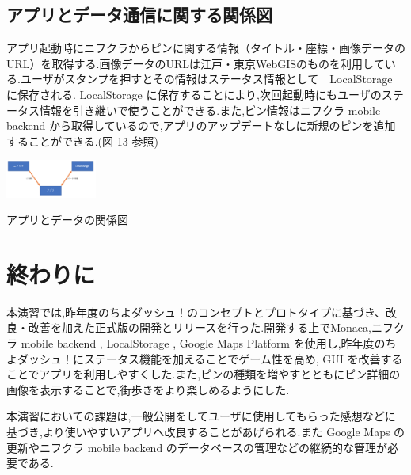 \documentclass[a4paper, twoside]{jarticle}
\makeatletter
\newenvironment{figurehere}
  {\def\@captype{figure}}
  {}
\makeatother
\begin{document}
\begin{multicols}{2}
\subsection{アプリとデータ通信に関する関係図}
アプリ起動時にニフクラからピンに関する情報（タイトル・座標・画像データのURL）を取得する.画像データのURLは江戸・東京WebGISのものを利用している.ユーザがスタンプを押すとその情報はステータス情報として　LocalStorage に保存される. LocalStorage に保存することにより,次回起動時にもユーザのステータス情報を引き継いで使うことができる.また,ピン情報はニフクラ mobile backend から取得しているので,アプリのアップデートなしに新規のピンを追加することができる.(図 13 参照)
\begin{figurehere}
\begin{center}
\includegraphics[bb=30 100 550 500,width=3cm]{./image12.png}%
\end{center}
\caption{アプリとデータの関係図}\label{fig:13}
\end{figurehere}


\section{終わりに}
本演習では,昨年度のちよダッシュ！のコンセプトとプロトタイプに基づき、改良・改善を加えた正式版の開発とリリースを行った.開発する上でMonaca,ニフクラ mobile backend , LocalStorage , Google Maps Platform を使用し,昨年度のちよダッシュ！にステータス機能を加えることでゲーム性を高め, GUI を改善することでアプリを利用しやすくした.また,ピンの種類を増やすとともにピン詳細の画像を表示することで,街歩きをより楽しめるようにした.\par
本演習においての課題は,一般公開をしてユーザに使用してもらった感想などに基づき,より使いやすいアプリへ改良することがあげられる.また Google Maps の更新やニフクラ mobile backend のデータベースの管理などの継続的な管理が必要である.



\end{multicols} %
\vspace{1cm}
\end{document}
